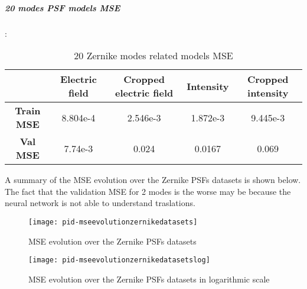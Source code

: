 		\subparagraph{20 modes PSF models MSE}:\\
		\begin{table}[h!]
			\centering
			\begin{tabular}{|c|c|c|c|c|}
				\hline
				  & \textbf{Electric field} & \textbf{Cropped electric field} & \textbf{Intensity} & \textbf{Cropped intensity}\\
				\hline
				\textbf{Train MSE} & 8.804e-4 & 2.546e-3 & 1.872e-3 & 9.445e-3 \\
				\hline
				\textbf{Val MSE} & 7.74e-3 & 0.024 & 0.0167 & 0.069 \\
				\hline
			\end{tabular}
		\caption{20 Zernike modes related models MSE}
		\end{table}
		\FloatBarrier
		
		A summary of the MSE evolution over the Zernike PSFs datasets is shown below. The fact that the validation MSE for 2 modes is the worse may be because the neural network is not able to understand traslations.
		\begin{figure*}[ht!]
			\centering
			\texttt{[image: pid-mseevolutionzernikedatasets]}
			\caption{MSE evolution over the Zernike PSFs datasets}
		\end{figure*}
		
		\begin{figure*}[ht!]
			\centering
			\texttt{[image: pid-mseevolutionzernikedatasetslog]}
			\caption{MSE evolution over the Zernike PSFs datasets in logarithmic scale}
		\end{figure*}
		
		\FloatBarrier
		
